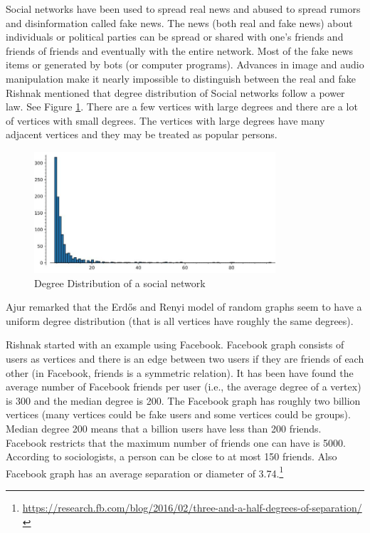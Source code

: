  Social networks have been used to spread real news and abused to spread rumors and disinformation called fake news. The news (both real and fake news) about individuals or political parties can be spread or shared with
 one's friends and friends of friends and eventually with the entire network. Most of the fake news items or  generated by bots (or computer programs). Advances in image and audio manipulation make it nearly impossible to distinguish between the real and fake 
 Rishnak mentioned that degree distribution of Social networks follow a power law. See Figure \ref{21p1}.  There are a few vertices with large degrees and there are a lot of vertices with small degrees.  The vertices with large degrees have many adjacent vertices and they may be treated as popular persons.
 \begin{figure}
 \begin{center}
\includegraphics[width=0.8\textwidth]{degreepowerlawdist.jpg}
\caption{Degree Distribution of a social network}\label{21p1}
\end{center}

\end{figure}
\begin{newpage}
\end{newpage}
 
 Ajur remarked that the Erd\H{o}s and Renyi model of random graphs seem to have a uniform degree distribution (that is all vertices have roughly the same degrees).
 
 Rishnak started with an example using Facebook. Facebook graph consists of users as vertices and there is an edge between two users if they are friends of each other (in Facebook, friends is a symmetric relation). It has been
 have found the average number of Facebook friends per user (i.e., the average degree of a vertex) is 300 and the median degree is 200. The Facebook graph has roughly two billion vertices (many vertices could be fake users and some vertices could be groups). Median degree 200 means that a billion users have less than 200 friends. Facebook restricts that the maximum number of friends one can have is 5000. According to sociologists, a person can be close to at most 150 friends. Also Facebook graph has an average separation or diameter of 3.74.\footnote{\url{https://research.fb.com/blog/2016/02/three-and-a-half-degrees-of-separation/}}
 
